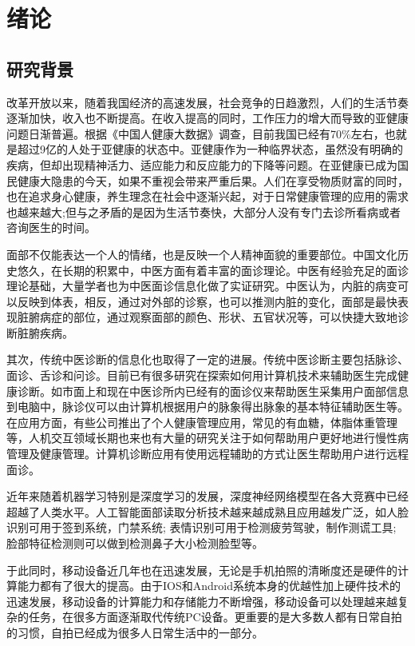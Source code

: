 \chapter{绪论}

\section{研究背景}
改革开放以来，随着我国经济的高速发展，社会竞争的日趋激烈，人们的生活节奏逐渐加快，收入也不断提高。在收入提高的同时，工作压力的增大而导致的亚健康问题日渐普遍。根据《中国人健康大数据》调查，目前我国已经有70\%左右，也就是超过9亿的人处于亚健康的状态中。亚健康作为一种临界状态，虽然没有明确的疾病，但却出现精神活力、适应能力和反应能力的下降等问题。在亚健康已成为国民健康大隐患的今天，如果不重视会带来严重后果。人们在享受物质财富的同时，也在追求身心健康，养生理念在社会中逐渐兴起，对于日常健康管理的应用的需求也越来越大;但与之矛盾的是因为生活节奏快，大部分人没有专门去诊所看病或者咨询医生的时间。

面部不仅能表达一个人的情绪，也是反映一个人精神面貌的重要部位。中国文化历史悠久，在长期的积累中，中医方面有着丰富的面诊理论。中医有经验充足的面诊理论基础，大量学者也为中医面诊信息化做了实证研究。中医认为，内脏的病变可以反映到体表，相反，通过对外部的诊察，也可以推测内脏的变化，面部是最快表现脏腑病症的部位，通过观察面部的颜色、形状、五官状况等，可以快捷大致地诊断脏腑疾病。

其次，传统中医诊断的信息化也取得了一定的进展。传统中医诊断主要包括脉诊、面诊、舌诊和问诊。目前已有很多研究在探索如何用计算机技术来辅助医生完成健康诊断。如市面上和现在中医诊所内已经有的面诊仪来帮助医生采集用户面部信息到电脑中，脉诊仪可以由计算机根据用户的脉象得出脉象的基本特征辅助医生等\cite{Zhang2018Study2}。在应用方面，有些公司推出了个人健康管理应用，常见的有血糖，体脂体重管理等，人机交互领域长期也来也有大量的研究关注于如何帮助用户更好地进行慢性病管理及健康管理。计算机诊断应用有使用远程辅助的方式让医生帮助用户进行远程面诊。

近年来随着机器学习特别是深度学习的发展，深度神经网络模型在各大竞赛中已经超越了人类水平。人工智能面部读取分析技术越来越成熟且应用越发广泛，如人脸识别可用于签到系统，门禁系统; 表情识别可用于检测疲劳驾驶，制作测谎工具; 脸部特征检测则可以做到检测鼻子大小检测脸型等。

于此同时，移动设备近几年也在迅速发展，无论是手机拍照的清晰度还是硬件的计算能力都有了很大的提高。由于IOS和Android系统本身的优越性加上硬件技术的迅速发展，移动设备的计算能力和存储能力不断增强，移动设备可以处理越来越复杂的任务，在很多方面逐渐取代传统PC设备。更重要的是大多数人都有日常自拍的习惯，自拍已经成为很多人日常生活中的一部分。


